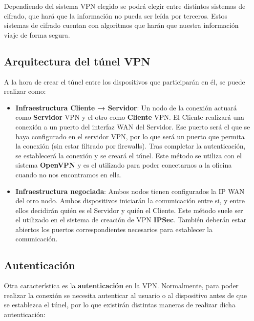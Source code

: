 Dependiendo del sistema VPN elegido se podrá elegir entre distintos sistemas de cifrado, que hará que la información no pueda ser leída por terceros. Estos sistemas de cifrado cuentan con algoritmos que harán que nuestra información viaje de forma segura.


\subsection{Arquitectura del túnel VPN}
A la hora de crear el túnel entre los dispositivos que participarán en él, se puede realizar como:

\begin{itemize}
    \item \textbf{Infraestructura Cliente → Servidor}: Un nodo de la conexión actuará como \textbf{Servidor} VPN y el otro como \textbf{Cliente} VPN. El Cliente realizará una conexión a un puerto del interfaz WAN del Servidor. Ese puerto será el que se haya configurado en el servidor VPN, por lo que será un puerto que permita la conexión (sin estar filtrado por firewalls). Tras completar la autenticación, se establecerá la conexión y se creará el túnel. Este método se utiliza con el sistema \textbf{OpenVPN} y es el utilizado para poder conectarnos a la oficina cuando no nos encontramos en ella.

    \item \textbf{Infraestructura negociada}: Ambos nodos tienen configurados la IP WAN del otro nodo. Ambos dispositivos iniciarán la comunicación entre si, y entre ellos decidirán quién es el Servidor y quién el Cliente. Este método suele ser el utilizado en el sistema de creación de VPN  \textbf{IPSec}. También deberán estar abiertos los puertos correspondientes necesarios para establecer la comunicación.
\end{itemize}


\subsection{Autenticación}
Otra característica es la \textbf{autenticación} en la VPN. Normalmente, para poder realizar la conexión se necesita autenticar al usuario o al dispositivo antes de que se establezca el túnel, por lo que existirán distintas maneras de realizar dicha autenticación:

